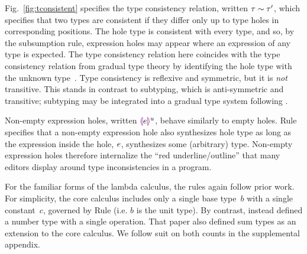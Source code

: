 

Fig.~\ref{fig:tconsistent} specifies the type consistency relation, written $\tau \sim \tau'$, which specifies that two types are consistent if they differ only up to type holes in corresponding positions.
%
The hole type is consistent with every type, and so, by the subsumption rule, expression holes may appear where an expression of any type is expected. The type consistency relation here coincides with the type consistency relation from gradual type theory by identifying the hole type with the unknown type~\cite{Siek06a}.
%
Type consistency is reflexive and symmetric, but it is \emph{not} transitive.
%
This stands in contrast to subtyping, which is anti-symmetric and transitive; subtyping may be integrated into a gradual type system following \citet{Siek:2007qy}.

Non-empty expression holes, written $\textcolor{violet}{\llparenthesis}e\textcolor{violet}{\rrparenthesis}^{u}$, behave similarly to empty holes.
%
Rule  specifies that a non-empty expression hole also synthesizes hole type as long as the expression inside the hole, $e$, synthesizes some (arbitrary) type.
%
Non-empty expression holes therefore internalize the ``red underline/outline'' that many editors display around type inconsistencies in a program.

For the familiar forms of the lambda calculus, the rules again follow prior work.
%
For simplicity, the core calculus includes only a single base type~$b$ with a single constant~$c$, governed by Rule  (i.e. $b$ is the unit type).
%
By contrast, \citet{popl-paper} instead defined a number type with a single operation. That paper also defined sum types as an extension to the core calculus. We follow suit on both counts in the supplemental appendix.%
%

